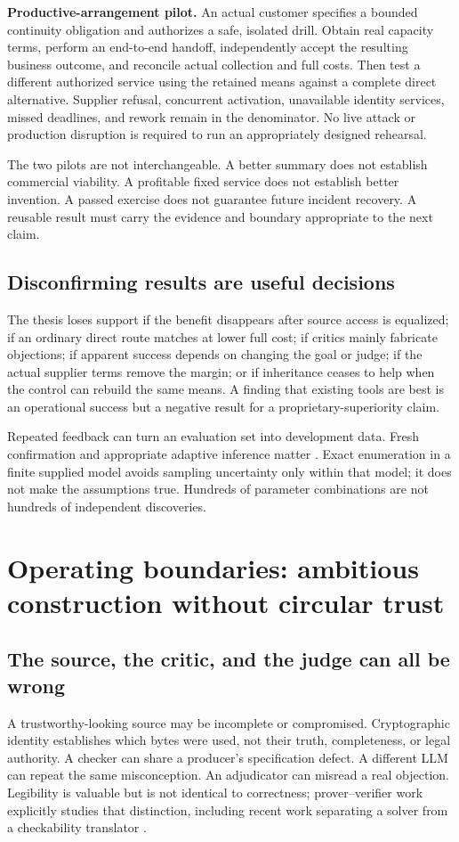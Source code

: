 \documentclass[11pt,a4paper]{article}
\begin{document}
\textbf{Productive-arrangement pilot.} An actual customer specifies a bounded continuity obligation and authorizes a safe, isolated drill. Obtain real capacity terms, perform an end-to-end handoff, independently accept the resulting business outcome, and reconcile actual collection and full costs. Then test a different authorized service using the retained means against a complete direct alternative. Supplier refusal, concurrent activation, unavailable identity services, missed deadlines, and rework remain in the denominator. No live attack or production disruption is required to run an appropriately designed rehearsal.

The two pilots are not interchangeable. A better summary does not establish commercial viability. A profitable fixed service does not establish better invention. A passed exercise does not guarantee future incident recovery. A reusable result must carry the evidence and boundary appropriate to the next claim.

\subsection{Disconfirming results are useful decisions}
The thesis loses support if the benefit disappears after source access is equalized; if an ordinary direct route matches at lower full cost; if critics mainly fabricate objections; if apparent success depends on changing the goal or judge; if the actual supplier terms remove the margin; or if inheritance ceases to help when the control can rebuild the same means. A finding that existing tools are best is an operational success but a negative result for a proprietary-superiority claim.

Repeated feedback can turn an evaluation set into development data. Fresh confirmation and appropriate adaptive inference matter \cite{dwork,howard}. Exact enumeration in a finite supplied model avoids sampling uncertainty only within that model; it does not make the assumptions true. Hundreds of parameter combinations are not hundreds of independent discoveries.

\section{Operating boundaries: ambitious construction without circular trust}
\subsection{The source, the critic, and the judge can all be wrong}
A trustworthy-looking source may be incomplete or compromised. Cryptographic identity establishes which bytes were used, not their truth, completeness, or legal authority. A checker can share a producer's specification defect. A different LLM can repeat the same misconception. An adjudicator can misread a real objection. Legibility is valuable but is not identical to correctness; prover--verifier work explicitly studies that distinction, including recent work separating a solver from a checkability translator \cite{kirchner,kim}.
\end{document}
